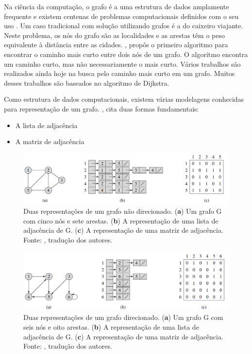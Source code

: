 Na ciência da computação, o grafo é a uma estrutura de dados amplamente frequente e existem centenas de problemas computacionais definidos com o seu uso \cite{Cormen2009}. Um caso tradicional com solução utilizando grafos é a do caixeiro viajante. Neste problema, os nós do grafo são as localidades e as arestas têm o peso equivalente à distância entre as cidades. \citep{Dijkstra1959}, propôs o primeiro algoritmo para encontrar o caminho mais curto entre dois nós de um grafo. O algoritmo encontra um caminho curto, mas não necessariamente o mais curto. Vários trabalhos são realizados ainda hoje na busca pelo caminho mais curto em um grafo. Muitos desses trabalhos são baseados no algoritmo de Dijkstra.

Como estrutura de dados computacionais, existem várias modelagens conhecidas para representação de um grafo. \citep{Cormen2009}, cita duas formas fundamentais:

\begin{itemize}
\item A lista de adjacência
\item A matriz de adjacência
\end{itemize}

\begin{figure}[!htb]
\centering
\includegraphics[width=16cm]{represent_grafo.png}
\caption{Duas representações de um grafo não direcionado. (\textbf{a}) Um grafo G com cinco nós e sete arestas. (\textbf{b}) A representação de uma lista de adjacência de G. (\textbf{c}) A representação de uma matriz de adjacência. Fonte: \cite{Cormen2009}, tradução dos autores.}
\label{fig:represent_grafo}
\end{figure}


\begin{figure}[!htb]
\centering
\includegraphics[width=16cm]{represent_grafo_ND.png}
\caption{Duas representações de um grafo direcionado. (\textbf{a}) Um grafo G com seis nós e oito arestas. (\textbf{b}) A representação de uma lista de adjacência de G. (\textbf{c}) A representação de uma matriz de adjacência. Fonte: \cite{Cormen2009}, tradução dos autores.}
\label{fig:represent_grafo_ND}
\end{figure}

